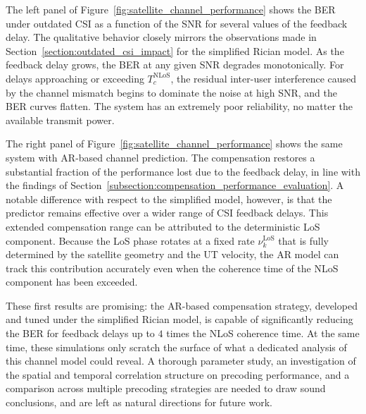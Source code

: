 The left panel of Figure~\ref{fig:satellite_channel_performance} shows the \ac{BER} under outdated \ac{CSI} as a function of the \ac{SNR} for several values of the feedback delay.
The qualitative behavior closely mirrors the observations made in Section~\ref{section:outdated_csi_impact} for the simplified Rician model.
As the feedback delay grows, the \ac{BER} at any given \ac{SNR} degrades monotonically.
For delays approaching or exceeding $T_c^{\mathrm{NLoS}}$, the residual inter-user interference caused by the channel mismatch begins to dominate the noise at high \ac{SNR}, and the \ac{BER} curves flatten. The system has an extremely poor reliability, no matter the available transmit power.

The right panel of Figure~\ref{fig:satellite_channel_performance} shows the same system with \ac{AR}-based channel prediction.
The compensation restores a substantial fraction of the performance lost due to the feedback delay, in line with the findings of Section~\ref{subsection:compensation_performance_evaluation}.
A notable difference with respect to the simplified model, however, is that the predictor remains effective over a wider range of \ac{CSI} feedback delays.
This extended compensation range can be attributed to the deterministic \ac{LoS} component.
Because the \ac{LoS} phase rotates at a fixed rate $\nu_k^{\mathrm{LoS}}$ that is fully determined by the satellite geometry and the \ac{UT} velocity, the \ac{AR} model can track this contribution accurately even when the coherence time of the \ac{NLoS} component has been exceeded.

These first results are promising: the \ac{AR}-based compensation strategy, developed and tuned under the simplified Rician model, is capable of significantly reducing the \ac{BER} for feedback delays up to $4$ times the \ac{NLoS} coherence time.
At the same time, these simulations only scratch the surface of what a dedicated analysis of this channel model could reveal.
A thorough parameter study, an investigation of the spatial and temporal correlation structure on precoding performance, and a comparison across multiple precoding strategies are needed to draw sound conclusions, and are left as natural directions for future work.

